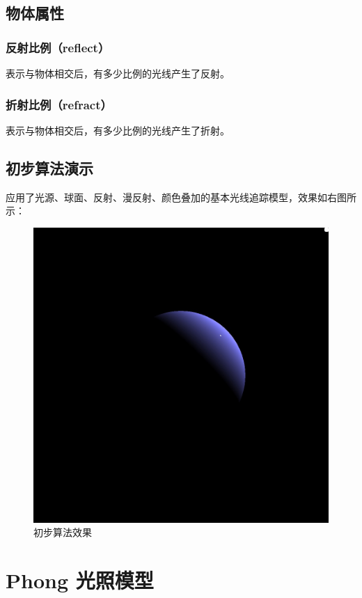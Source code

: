 \documentclass[10pt,twocolumn]{article}
\begin{document}
\subsection{\hei 物体属性}
\subsubsection{\hei 反射比例（reflect）}
表示与物体相交后，有多少比例的光线产生了反射。
\subsubsection{\hei 折射比例（refract）}
表示与物体相交后，有多少比例的光线产生了折射。

\subsection{\hei 初步算法演示}
应用了光源、球面、反射、漫反射、颜色叠加的基本光线追踪模型，效果如右图所示：

\newpage

\begin{figure}[!ht]
\centering
\includegraphics[scale=.2]{fig2.jpg}
\caption{初步算法效果}
\end{figure}

\section{\hei Phong 光照模型}
\end{document}
